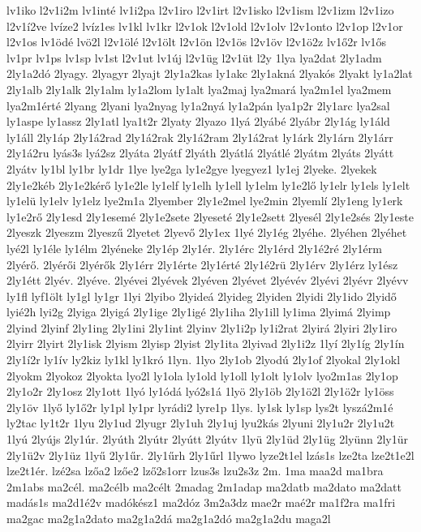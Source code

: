 {lv1iko
l2v1i2m
lv1inté
lv1i2pa
l2v1iro
l2v1irt
l2v1isko
l2v1ism
l2v1izm
l2v1izo
l2v1í2ve
lvíze2
lvíz1es
lv1kl
lv1kr
l2v1ok
l2v1old
l2v1olv
l2v1onto
l2v1op
l2v1or
l2v1os
lv1ödé
lvö2l
l2v1ölé
l2v1ölt
l2v1ön
l2v1ös
l2v1öv
l2v1ö2z
lv1ő2r
lv1ős
lv1pr
lv1ps
lv1sp
lv1st
l2v1ut
lv1új
l2v1üg
l2v1üt
l2y
1lya
lya2dat
2ly1adm
2ly1a2dó
2lyagy.
2lyagyr
2lyajt
2ly1a2kas
ly1akc
2ly1akná
2lyakós
2lyakt
ly1a2lat
2ly1alb
2ly1alk
2ly1alm
ly1a2lom
ly1alt
lya2maj
lya2mará
lya2m1el
lya2mem
lya2m1érté
2lyang
2lyani
lya2nyag
ly1a2nyá
ly1a2pán
lya1p2r
2ly1arc
lya2sal
ly1aspe
ly1assz
2ly1atl
lya1t2r
2lyaty
2lyazo
1lyá
2lyábé
2lyábr
2ly1ág
ly1áld
ly1áll
2ly1áp
2ly1á2rad
2ly1á2rak
2ly1á2ram
2ly1á2rat
ly1árk
2ly1árn
2ly1árr
2ly1á2ru
lyás3s
lyá2sz
2lyáta
2lyátf
2lyáth
2lyátlá
2lyátlé
2lyátm
2lyáts
2lyátt
2lyátv
ly1bl
ly1br
ly1dr
1lye
lye2ga
ly1e2gye
lyegyez1
ly1ej
2lyeke.
2lyekek
2ly1e2kéb
2ly1e2kérő
ly1e2le
ly1elf
ly1elh
ly1ell
ly1elm
ly1e2lő
ly1elr
ly1els
ly1elt
ly1elü
ly1elv
ly1elz
lye2m1a
2lyember
2ly1e2mel
lye2min
2lyemlí
2ly1eng
ly1erk
ly1e2rő
2ly1esd
2ly1esemé
2ly1e2sete
2lyeseté
2ly1e2sett
2lyesél
2ly1e2sés
2ly1este
2lyeszk
2lyeszm
2lyeszű
2lyetet
2lyevő
2ly1ex
1lyé
2ly1ég
2lyéhe.
2lyéhen
2lyéhet
lyé2l
ly1éle
ly1élm
2lyéneke
2ly1ép
2ly1ér.
2ly1érc
2ly1érd
2ly1é2ré
2ly1érm
2lyérő.
2lyérői
2lyérők
2ly1érr
2ly1érte
2ly1érté
2ly1é2rü
2ly1érv
2ly1érz
ly1ész
2ly1étt
2lyév.
2lyéve.
2lyévei
2lyévek
2lyéven
2lyévet
2lyévév
2lyévi
2lyévr
2lyévv
ly1fl
lyf1ölt
ly1gl
ly1gr
1lyi
2lyibo
2lyideá
2lyideg
2lyiden
2lyidi
2ly1ido
2lyidő
lyié2h
lyi2g
2lyiga
2lyigá
2ly1ige
2ly1igé
2ly1iha
2ly1ill
ly1ima
2lyimá
2lyimp
2lyind
2lyinf
2ly1ing
2ly1ini
2ly1int
2lyinv
2ly1i2p
ly1i2rat
2lyirá
2lyiri
2ly1iro
2lyirr
2lyirt
2ly1isk
2lyism
2lyisp
2lyist
2ly1ita
2lyivad
2ly1i2z
1lyí
2ly1íg
2ly1ín
2ly1í2r
ly1ív
ly2kiz
ly1kl
ly1kró
1lyn.
1lyo
2ly1ob
2lyodú
2ly1of
2lyokal
2ly1okl
2lyokm
2lyokoz
2lyokta
lyo2l
ly1ola
ly1old
ly1oll
ly1olt
ly1olv
lyo2m1as
2ly1op
2ly1o2r
2ly1osz
2ly1ott
1lyó
ly1ódá
lyó2s1á
1lyö
2ly1öb
2ly1ö2l
2ly1ö2r
ly1öss
2ly1öv
1lyő
ly1ő2r
ly1pl
ly1pr
lyrádi2
lyre1p
1lys.
ly1sk
ly1sp
lys2t
lyszá2m1é
ly2tac
ly1t2r
1lyu
2ly1ud
2lyugr
2ly1uh
2ly1uj
lyu2kás
2lyuni
2ly1u2r
2ly1u2t
1lyú
2lyújs
2ly1úr.
2lyúth
2lyútr
2lyútt
2lyútv
1lyü
2ly1üd
2ly1üg
2lyünn
2ly1ür
2ly1ü2v
2ly1üz
1lyű
2ly1űr.
2ly1űrh
2ly1űrl
1lywo
lyze2t1el
lzás1s
lze2ta
lze2t1e2l
lze2t1ér.
lzé2sa
lzőa2
lzőe2
lző2s1orr
lzus3s
lzu2s3z
2m.
1ma
maa2d
ma1bra
2m1abs
ma2cél.
ma2célb
ma2célt
2madag
2m1adap
ma2datb
ma2dato
ma2datt
madás1s
ma2d1é2v
madókész1
ma2dóz
3m2a3dz
mae2r
maé2r
ma1f2ra
ma1fri
ma2gac
ma2g1a2dato
ma2g1a2dá
ma2g1a2dó
ma2g1a2du
maga2l
}
